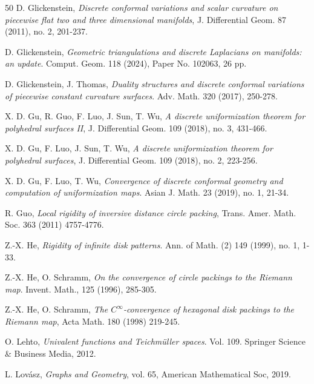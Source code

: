 \documentclass[12pt]{amsart}
\begin{document}
\begin{thebibliography}{50}
 D. Glickenstein, \emph{Discrete conformal variations and scalar curvature on piecewise flat two and three dimensional manifolds}, J. Differential Geom. 87 (2011), no. 2, 201-237.

 D. Glickenstein, \emph{Geometric triangulations and discrete Laplacians on manifolds: an update}. Comput. Geom. 118 (2024), Paper No. 102063, 26 pp.

 D. Glickenstein, J. Thomas,  \emph{Duality structures and discrete conformal variations of piecewise constant curvature surfaces}. Adv. Math. 320 (2017), 250-278.

 X. D. Gu, R. Guo, F. Luo, J. Sun, T. Wu, \emph{A discrete uniformization theorem for polyhedral surfaces II}, J. Differential Geom. 109 (2018), no. 3, 431-466.

 X. D. Gu, F. Luo, J. Sun, T. Wu, \emph{A discrete uniformization theorem for polyhedral surfaces}, J. Differential Geom. 109 (2018), no. 2, 223-256.

 X. D. Gu, F. Luo,  T. Wu,  \emph{Convergence of discrete conformal geometry and computation of uniformization maps}. Asian J. Math. 23 (2019), no. 1, 21-34.

 R. Guo, \emph{Local rigidity of inversive distance circle packing}, Trans. Amer. Math. Soc. 363 (2011) 4757-4776.



 Z.-X. He, \emph{Rigidity of infinite disk patterns}. Ann. of Math. (2) 149 (1999), no. 1, 1-33.


 Z.-X. He, O. Schramm, \emph{On the convergence of circle packings to the Riemann map}. Invent. Math., 125 (1996), 285-305.


 Z.-X. He, O. Schramm, \emph{The $C^\infty$-convergence of hexagonal disk packings to the Riemann map}, Acta Math. 180 (1998) 219-245.

 O. Lehto,  \emph{Univalent functions and Teichm\"{u}ller spaces}. Vol. 109. Springer Science \& Business Media, 2012.

 L. Lovász,  \emph{Graphs and Geometry}, vol. 65, American Mathematical Soc, 2019.


\end{thebibliography}
\end{document}
